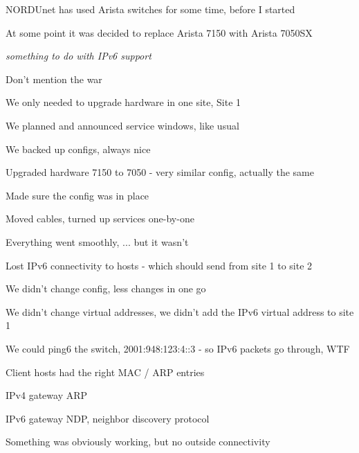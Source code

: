\documentclass[18pt,landscape,a4paper,footrule]{foils}
\begin{document}

\begin{list2}
\item NORDUnet has used Arista switches for some time, before I started
\item At some point it was decided to replace Arista 7150 with Arista 7050SX
\item \emph{something to do with IPv6 support}
\item Don't mention the war
\item We only needed to upgrade hardware in one site, Site 1
\item We planned and announced service windows, like usual
\end{list2}


\begin{list2}
\item We backed up configs, always nice
\item Upgraded hardware 7150 to 7050 - very similar config, actually the same
\item Made sure the config was in place
\item Moved cables, turned up services one-by-one
\end{list2}

Everything went smoothly, ... but it wasn't
\begin{list2}
\item Lost IPv6 connectivity to hosts - which should send from site 1 to site 2
\item We didn't change config, less changes in one go
\item We didn't change virtual addresses, we didn't add the IPv6 virtual address to site 1
\item We could ping6 the switch, 2001:948:123:4::3 - so IPv6 packets go through, WTF
\end{list2}


\begin{list2}
\item Client hosts had the right MAC / ARP entries
\item IPv4 gateway ARP
\item IPv6 gateway NDP, neighbor discovery protocol
\item Something was obviously working, but no outside connectivity
\end{list2}
\end{document}
